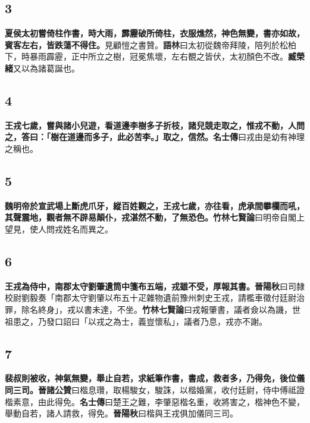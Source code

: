 \subsection*{3}

\textbf{夏侯太初嘗倚柱作書，時大雨，霹靂破所倚柱，衣服燋然，神色無變，書亦如故，賓客左右，皆跌蕩不得住。}{\footnotesize 見顧愷之書贊。\textbf{語林}曰太初從魏帝拜陵，陪列於松柏下，時暴雨霹靂，正中所立之樹，冠冕焦壞，左右覩之皆伏，太初顏色不改。\textbf{臧榮緒}又以為諸葛誕也。}

\subsection*{4}

\textbf{王戎七歲，嘗與諸小兒遊，看道邊李樹多子折枝，諸兒競走取之，惟戎不動，人問之，答曰：「樹在道邊而多子，此必苦李。」取之，信然。}{\footnotesize \textbf{名士傳}曰戎由是幼有神理之稱也。}

\subsection*{5}

\textbf{魏明帝於宣武場上斷虎爪牙，縱百姓觀之，王戎七歲，亦往看，虎承間攀欄而吼，其聲震地，觀者無不辟易顛仆，戎湛然不動，了無恐色。}{\footnotesize \textbf{竹林七賢論}曰明帝自閣上望見，使人問戎姓名而異之。}

\subsection*{6}

\textbf{王戎為侍中，南郡太守劉肇遺筒中箋布五端，戎雖不受，厚報其書。}{\footnotesize \textbf{晉陽秋}曰司隸校尉劉毅奏「南郡太守劉肇以布五十疋雜物遺前豫州刺史王戎，請檻車徵付廷尉治罪，除名終身」，戎以書未達，不坐。\textbf{竹林七賢論}曰戎報肇書，議者僉以為譏，世祖患之，乃發口詔曰「以戎之為士，義豈懷私」，議者乃息，戎亦不謝。}

\subsection*{7}

\textbf{裴叔則被收，神氣無變，舉止自若，求紙筆作書，書成，救者多，乃得免，後位儀同三司。}{\footnotesize \textbf{晉諸公贊}曰楷息瓚，取楊駿女，駿誅，以楷婚黨，收付廷尉，侍中傅祗證楷素意，由此得免。\textbf{名士傳}曰楚王之難，李肇惡楷名重，收將害之，楷神色不變，舉動自若，諸人請救，得免。\textbf{晉陽秋}曰楷與王戎俱加儀同三司。}

